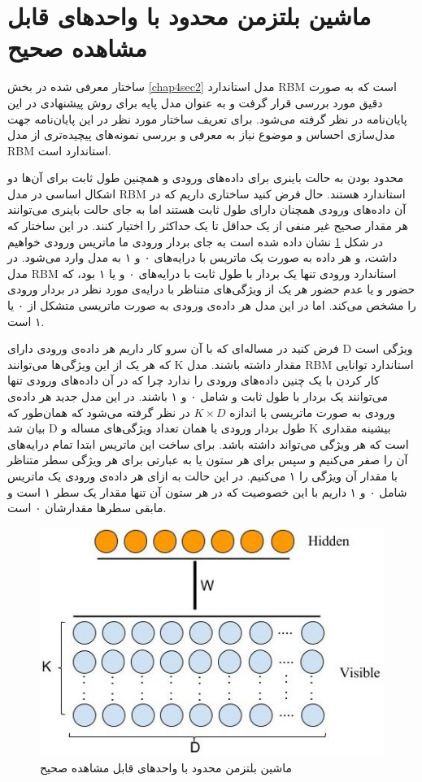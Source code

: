 \section{ماشین بلتزمن محدود با واحدهای قابل مشاهده صحیح}
\label{chap4sec3}
ساختار معرفی‌ شده در بخش
\ref{chap4sec2}
مدل استاندارد
RBM
است که به صورت دقیق مورد بررسی‌ قرار گرفت و به عنوان مدل پایه برای روش پیشنهادی در این پایان‌‌نامه در نظر گرفته می‌‌شود. برای تعریف ساختار مورد نظر در این پایان‌‌نامه جهت مدل‌سازی احساس و موضوع نیاز به معرفی‌ و بررسی‌ نمونه‌های پیچیده‌تری از مدل
RBM
استاندارد است.

محدود بودن به حالت باینری برای داده‌های ورودی و همچنین طول ثابت برای آن‌ها دو اشکال اساسی در مدل
RBM
استاندارد هستند. حال فرض کنید ساختاری داریم که در آن داده‌های ورودی همچنان دارای طول ثابت هستند اما به جای حالت باینری می‌‌توانند هر مقدار صحیح غیر منفی‌ از یک حداقل تا یک حداکثر را اختیار کنند. در این ساختار که در شکل
\ref{chap4-fig2}
نشان داده شده است به جای بردار ورودی ما ماتریس ورودی خواهیم داشت، و هر داده به صورت یک ماتریس با درایه‌های ۰ و ۱ به مدل وارد می‌‌شود. در مدل
RBM
استاندارد ورودی تنها یک بردار با طول ثابت با درایه‌های ۰ و یا ۱ بود، که حضور و یا عدم حضور هر یک از ویژگی‌‌های متناظر با درایه‌ی مورد نظر در بردار ورودی را مشخص می‌‌کند. اما در این مدل هر داده‌ی ورودی به صورت ماتریسی متشکل از ۰ یا ۱ است.

فرض کنید در مساله‌ای‌ که با آن سرو کار داریم هر داده‌ی ورودی دارای
D
ویژگی‌ است که هر یک از این ویژگی‌ها می‌‌توانند 
K
مقدار داشته باشند. مدل
RBM
استاندارد توانایی کار کردن با یک چنین داده‌های ورودی را ندارد چرا که در آن داده‌های ورودی تنها می‌‌توانند یک بردار با طول ثابت و شامل ۰ و ۱ باشند. در این مدل جدید هر داده‌ی ورودی به صورت ماتریسی با اندازه
$K \times D$
در نظر گرفته می‌شود که همان‌طور که بیان شد
D
طول بردار ورودی یا همان تعداد ویژگی‌های مساله و
K
بیشینه مقداری است که هر ویژگی‌ می‌‌تواند داشته باشد. برای ساخت این ماتریس ابتدا تمام درایه‌های آن را صفر می‌‌کنیم و سپس برای هر ستون یا به عبارتی برای هر ویژگی‌ سطر متناظر با مقدار آن ویژگی‌ را ۱ می‌‌کنیم. در این حالت به ازای هر داده‌ی ورودی یک ماتریس شامل ۰ و ۱ داریم با این خصوصیت که در هر ستون آن تنها مقدار یک سطر  ۱ است و مابقی سطرها مقدارشان ۰ است.
\begin{figure}[!t]
	\centering
	\includegraphics[scale=0.5]{chap4-img/MRBM}
	\caption{ماشین بلتزمن محدود با واحدهای قابل مشاهده صحیح}
	\label{chap4-fig2}
\end{figure}

